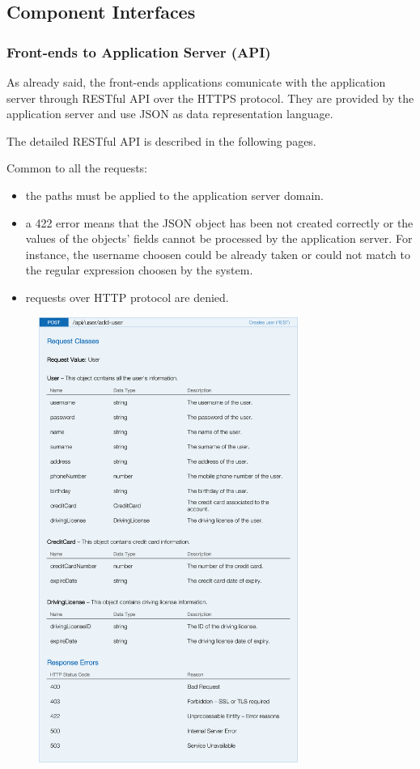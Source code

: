 \subsection{Component Interfaces}

\subsubsection{Front-ends to Application Server (API)}

As already said, the front-ends applications comunicate with the application server through RESTful API over the HTTPS protocol. They are provided by the application server and use JSON as data representation language.

The detailed RESTful API is described in the following pages. 

Common to all the requests:
\begin{itemize}
	\item the paths must be applied to the application server domain.
	\item a 422 error means that the JSON object has been not created correctly or the values of the objects' fields cannot be processed by the application server. For instance, the username choosen could be already taken or could not match to the regular expression choosen by the system.
	\item requests over HTTP protocol are denied.
\end{itemize}


\begin{figure}[H]
	\noindent
    	\centering
    	\includegraphics[height=550px, keepaspectratio]{apitables/APIAddUser.png}
    	\label{fig:api-add-user}
\end{figure}

